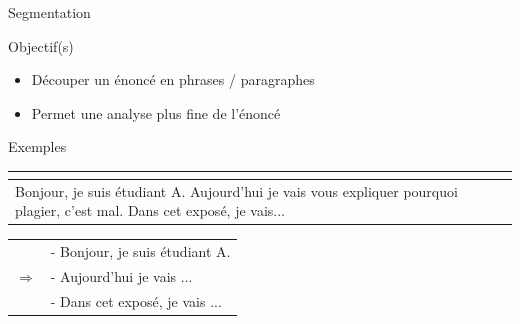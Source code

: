 \documentclass[serif, aspectratio=169]{beamer}
\begin{document}
\begin{frame}{Segmentation}
    \pause
    \begin{block}{Objectif(s)}
        \begin{itemize}
            \item Découper un énoncé en phrases / paragraphes
            \item Permet une analyse plus fine de l'énoncé
        \end{itemize}
    \end{block}
    \pause
    \begin{block}{Exemples}
        \begin{minipage}{0.45\columnwidth}
            \begin{tabular}{|p{5cm}|}
                \multicolumn{1}{c}{} \\ 
                \hline
                Bonjour, je suis étudiant A. Aujourd'hui je vais vous expliquer pourquoi plagier, c'est mal. Dans cet exposé, je vais... \\
                \hline
            \end{tabular}
        \end{minipage}
        \hfill
        \begin{minipage}{0.45\columnwidth}
            \begin{tabular}{cp{5cm}}
                \\
                & - Bonjour, je suis étudiant A. \\
                $\Rightarrow$ & - Aujourd'hui je vais ... \\
                & - Dans cet exposé, je vais ... \\
            \end{tabular}
        \end{minipage}
    \end{block}
\end{frame}
\end{document}
